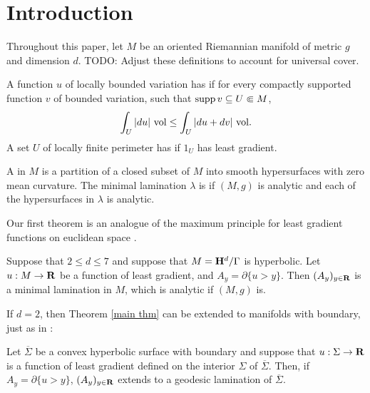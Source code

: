 \section{Introduction}
Throughout this paper, let $M$ be an oriented Riemannian manifold of metric $g$ and dimension $d$.
TODO: Adjust these definitions to account for universal cover.

\begin{definition}\label{main definitions}
A function $u$ of locally bounded variation has  if for every compactly supported function $v$ of bounded variation, such that $\operatorname{supp} v \subseteq U \Subset M$,
$$\int_U |du| ~\mathrm{vol} \leq \int_U |du + dv| ~\mathrm{vol}.$$
A set $U$ of locally finite perimeter has  if $1_U$ has least gradient.
\end{definition}

\begin{definition}
A  in $M$ is a partition of a closed subset of $M$ into smooth hypersurfaces with zero mean curvature.
The minimal lamination $\lambda$ is  if $(M, g)$ is analytic and each of the hypersurfaces in $\lambda$ is analytic.
\end{definition}

Our first theorem is an analogue of the maximum principle for least gradient functions on euclidean space \cite[Proposition 3.4]{górny2017planar}.

\begin{theorem}\label{main thm}
Suppose that $2 \leq d \leq 7$ and suppose that $M = \mathbf H^d/\Gamma$ is hyperbolic. 
Let $u: M \to \mathbf{R}$ be a function of least gradient, and $A_y = \partial \{u > y\}$.
Then $(A_y)_{y \in \mathbf{R}}$ is a minimal lamination in $M$, which is analytic if $(M, g)$ is.
\end{theorem}

If $d = 2$, then Theorem \ref{main thm} can be extended to manifolds with boundary, just as in \cite[Corollary 3.5]{górny2017planar}:

\begin{theorem}\label{main crly}
Let $\overline \Sigma$ be a convex hyperbolic surface with boundary and suppose that $u: \Sigma \to \mathbf{R}$ is a function of least gradient defined on the interior $\Sigma$ of $\overline \Sigma$.
Then, if $A_y = \partial \{u > y\}$, $(A_y)_{y \in \mathbf{R}}$ extends to a geodesic lamination of $\overline \Sigma$.
\end{theorem}

